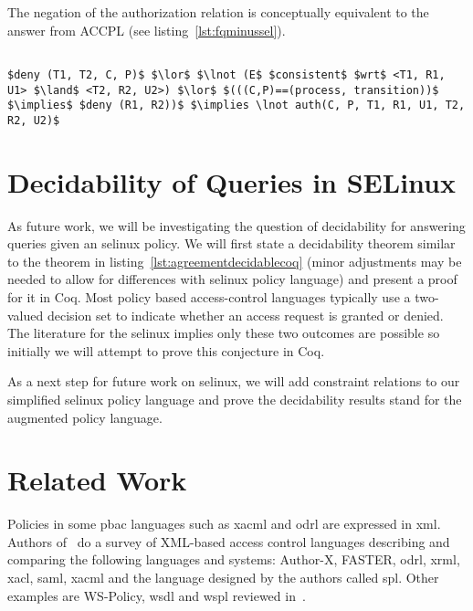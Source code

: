 The negation of the authorization relation  is conceptually equivalent to the  answer from \ac{ACCPL} (see listing~\ref{lst:fqminussel}).

\lstset{mathescape, language=AST} 
\begin{lstlisting}[frame=single, caption={\syn{NotPermitted} for \ac{selinux}},label={lst:fqminussel}]

$deny (T1, T2, C, P)$ $\lor$ $\lnot (E$ $consistent$ $wrt$ <T1, R1, U1> $\land$ <T2, R2, U2>) $\lor$ $(((C,P)==(process, transition))$ $\implies$ $deny (R1, R2))$ $\implies \lnot auth(C, P, T1, R1, U1, T2, R2, U2)$ 

\end{lstlisting}

\section{Decidability of Queries in SELinux}

As future work, we will be investigating the question of decidability for answering queries given an \ac{selinux} policy. We will first state a decidability theorem similar to the theorem in listing~\ref{lst:agreementdecidablecoq} (minor adjustments may be needed to allow for differences with \ac{selinux} policy language) and present a proof for it in Coq. Most policy based access-control languages typically use a two-valued decision set to indicate whether an access request is granted or denied. The literature for the \ac{selinux} implies only these two outcomes are possible so initially we will attempt to prove this conjecture in Coq. 

As a next step for future work on \ac{selinux}, we will add constraint relations to our simplified \ac{selinux} policy language and prove the decidability results stand for the augmented policy language.

\section{Related Work}

Policies in some \ac{pbac} languages such as \ac{xacml} and \ac{odrl} are expressed in \ac{xml}. Authors of~\cite{surveyXML} do a survey of XML-based access control languages describing and comparing the following languages and systems: Author-X, FASTER, \ac{odrl}, \ac{xrml}, \ac{xacl}, \ac{saml}, \ac{xacml} and the language designed by the authors called \ac{spl}. Other examples are WS-Policy, \ac{wsdl} and \ac{wspl} reviewed in~\cite{ArdagnaDVS04}.

